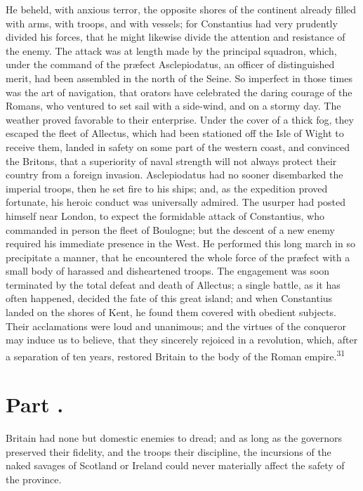 He beheld, with anxious terror, the opposite shores of the
continent already filled with arms, with troops, and with
vessels; for Constantius had very prudently divided his forces,
that he might likewise divide the attention and resistance of the
enemy. The attack was at length made by the principal squadron,
which, under the command of the præfect Asclepiodatus, an officer
of distinguished merit, had been assembled in the north of the
Seine. So imperfect in those times was the art of navigation,
that orators have celebrated the daring courage of the Romans,
who ventured to set sail with a side-wind, and on a stormy day.
The weather proved favorable to their enterprise. Under the cover
of a thick fog, they escaped the fleet of Allectus, which had
been stationed off the Isle of Wight to receive them, landed in
safety on some part of the western coast, and convinced the
Britons, that a superiority of naval strength will not always
protect their country from a foreign invasion. Asclepiodatus had
no sooner disembarked the imperial troops, then he set fire to
his ships; and, as the expedition proved fortunate, his heroic
conduct was universally admired. The usurper had posted himself
near London, to expect the formidable attack of Constantius, who
commanded in person the fleet of Boulogne; but the descent of a
new enemy required his immediate presence in the West. He
performed this long march in so precipitate a manner, that he
encountered the whole force of the præfect with a small body of
harassed and disheartened troops. The engagement was soon
terminated by the total defeat and death of Allectus; a single
battle, as it has often happened, decided the fate of this great
island; and when Constantius landed on the shores of Kent, he
found them covered with obedient subjects. Their acclamations
were loud and unanimous; and the virtues of the conqueror may
induce us to believe, that they sincerely rejoiced in a
revolution, which, after a separation of ten years, restored
Britain to the body of the Roman empire.\textsuperscript{31}


\section{Part \thesection.}

Britain had none but domestic enemies to dread; and as long as
the governors preserved their fidelity, and the troops their
discipline, the incursions of the naked savages of Scotland or
Ireland could never materially affect the safety of the province.

